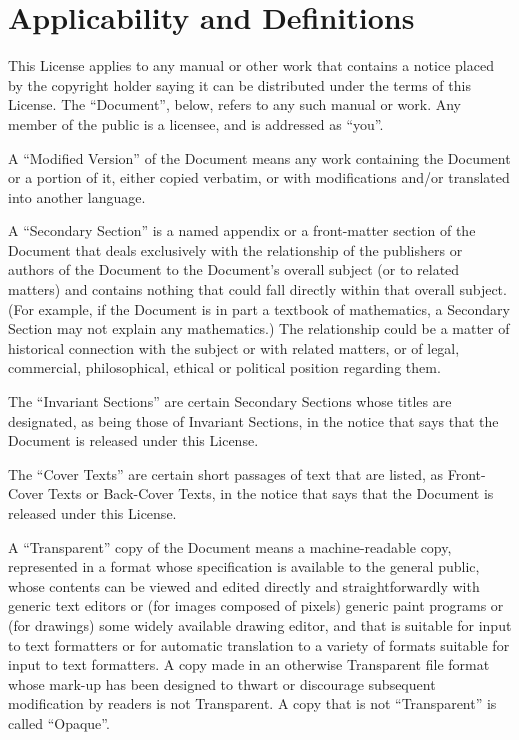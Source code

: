     \section{Applicability and Definitions}

    This License applies to any manual or other work that contains a
    notice placed by the copyright holder saying it can be distributed
    under the terms of this License.  The ``Document'', below, refers to any
    such manual or work.  Any member of the public is a licensee, and is
    addressed as ``you''.

    A ``Modified Version'' of the Document means any work containing the
    Document or a portion of it, either copied verbatim, or with
    modifications and/or translated into another language.

    A ``Secondary Section'' is a named appendix or a front-matter section of
    the Document that deals exclusively with the relationship of the
    publishers or authors of the Document to the Document's overall subject
    (or to related matters) and contains nothing that could fall directly
    within that overall subject.  (For example, if the Document is in part a
    textbook of mathematics, a Secondary Section may not explain any
    mathematics.)  The relationship could be a matter of historical
    connection with the subject or with related matters, or of legal,
    commercial, philosophical, ethical or political position regarding
    them.

    The ``Invariant Sections'' are certain Secondary Sections whose titles
    are designated, as being those of Invariant Sections, in the notice
    that says that the Document is released under this License.

    The ``Cover Texts'' are certain short passages of text that are listed,
    as Front-Cover Texts or Back-Cover Texts, in the notice that says that
    the Document is released under this License.

    A ``Transparent'' copy of the Document means a machine-readable copy,
    represented in a format whose specification is available to the
    general public, whose contents can be viewed and edited directly and
    straightforwardly with generic text editors or (for images composed of
    pixels) generic paint programs or (for drawings) some widely available
    drawing editor, and that is suitable for input to text formatters or
    for automatic translation to a variety of formats suitable for input
    to text formatters.  A copy made in an otherwise Transparent file
    format whose mark-up has been designed to thwart or discourage
    subsequent modification by readers is not Transparent.  A copy that is
    not ``Transparent'' is called ``Opaque''.

